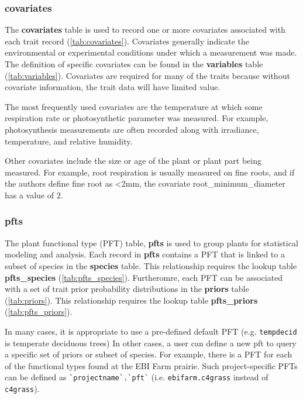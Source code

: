 \documentclass[10pt]{article}
\begin{document}
\subsubsection{covariates}

  The \textbf{covariates} table is used to record one or more covariates associated with each trait record  (\autoref{tab:covariates}). 
 Covariates generally indicate the environmental or experimental conditions under which a measurement was made.
 The definition of specific covariates can be found in the \textbf{variables} table (\autoref{tab:variables}).
 Covariates are required for many of the traits because without covariate information, the trait data will have limited value.
 
 The most frequently used covariates are the temperature at which some respiration rate or photosynthetic parameter was measured. 
 For example, photosynthesis measurements are often recorded along with irradiance, temperature, and relative humidity.

 Other covariates include the size or age of the plant or plant part being measured.
 For example, root respiration is usually measured on fine roots, and if the authors define fine root as <2mm, the covariate root\_minimum\_diameter has a value of $2$.


\subsubsection{pfts}

 The plant functional type (PFT) table, \textbf{pfts} is used to group plants for statistical modeling and analysis.
 Each record in \textbf{pfts} contains a PFT that is linked to a subset of species in the \textbf{species} table. 
 This relationship requires the lookup table \textbf{pfts\_species} (\autoref{tab:pfts_species}).
 Furtheromre, each PFT can be associated with a set of trait prior probability distributions in the \textbf{priors} table (\autoref{tab:priors}).
 This relationship requires the lookup table \textbf{pfts\_priors} (\autoref{tab:pfts_priors}).

 In many cases, it is appropriate to use a pre-defined default PFT (e.g. \verb+tempdecid+ is temperate deciduous trees)
 In other cases, a user can define a new pft to query a specific set of priors or subset of species.
 For example, there is a PFT for each of the functional types found at the EBI Farm prairie.
 Such project-specific PFTs can be defined as \verb+`projectname`.`pft`+ (i.e. \verb+ebifarm.c4grass+ instead of \verb+c4grass+).
\end{document}
